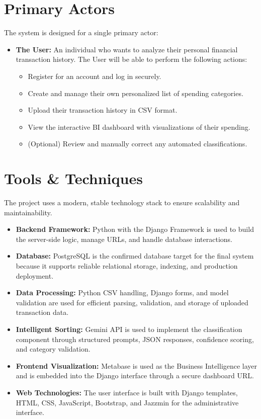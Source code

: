 \section{Primary Actors}
The system is designed for a single primary actor:
\begin{itemize}
	\item \textbf{The User:} An individual who wants to analyze their personal financial transaction history. The User will be able to perform the following actions:
	\begin{itemize}
		\item Register for an account and log in securely.
		\item Create and manage their own personalized list of spending categories.
		\item Upload their transaction history in CSV format.
		\item View the interactive BI dashboard with visualizations of their spending.
		\item (Optional) Review and manually correct any automated classifications.
	\end{itemize}
\end{itemize}

\section{Tools \& Techniques}
The project uses a modern, stable technology stack to ensure scalability and maintainability.
\begin{itemize}
	\item \textbf{Backend Framework:} Python with the Django Framework is used to build the server-side logic, manage URLs, and handle database interactions.
	\item \textbf{Database:} PostgreSQL is the confirmed database target for the final system because it supports reliable relational storage, indexing, and production deployment.
	\item \textbf{Data Processing:} Python CSV handling, Django forms, and model validation are used for efficient parsing, validation, and storage of uploaded transaction data.
	\item \textbf{Intelligent Sorting:} Gemini API is used to implement the classification component through structured prompts, JSON responses, confidence scoring, and category validation.
	\item \textbf{Frontend Visualization:} Metabase is used as the Business Intelligence layer and is embedded into the Django interface through a secure dashboard URL.
	\item \textbf{Web Technologies:} The user interface is built with Django templates, HTML, CSS, JavaScript, Bootstrap, and Jazzmin for the administrative interface.
\end{itemize}

